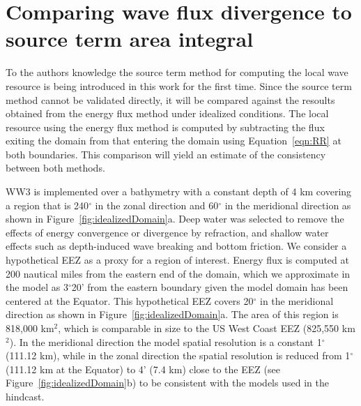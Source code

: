 \section{Comparing wave flux divergence to source term area integral}\label{appendix:flux-vs-area}

To the authors knowledge the source term method for computing the local wave resource is being introduced in this work for the first time. Since the source term method cannot be validated directly, it will be compared against the resoults obtained from the energy flux method under idealized conditions. The local resource using the energy flux method is computed by subtracting the flux exiting the domain from that entering the domain using Equation~\eqref{eqn:RR} at both boundaries. This comparison will yield an estimate of the consistency between both methods.

WW3 is implemented over a bathymetry with a constant depth of 4 km covering a region that is 240$^{\circ}$ in the zonal direction and 60$^{\circ}$ in the meridional direction as shown in Figure~\ref{fig:idealizedDomain}a. Deep water was selected to remove the effects of energy convergence or divergence by refraction, and shallow water effects such as depth-induced wave breaking and bottom friction. We consider a hypothetical EEZ as a proxy for a region of interest. Energy flux is computed at 200 nautical miles from the eastern end of the domain, which we approximate in the model as 3$^{\circ}$20’ from the eastern boundary given the model domain has been centered at the Equator. This hypothetical EEZ covers 20$^{\circ}$ in the meridional direction as shown in Figure~\ref{fig:idealizedDomain}a. The area of this region is 818,000 km$^{2}$, which is comparable in size to the US West Coast EEZ (825,550 km$^{2}$). In the meridional direction the model spatial resolution is a constant 1$^{\circ}$ (111.12 km), while in the zonal direction the spatial resolution is reduced from 1$^{\circ}$ (111.12 km at the Equator) to 4’ (7.4 km) close to the EEZ (see Figure~\ref{fig:idealizedDomain}b) to be consistent with the models used in the hindcast.
 
